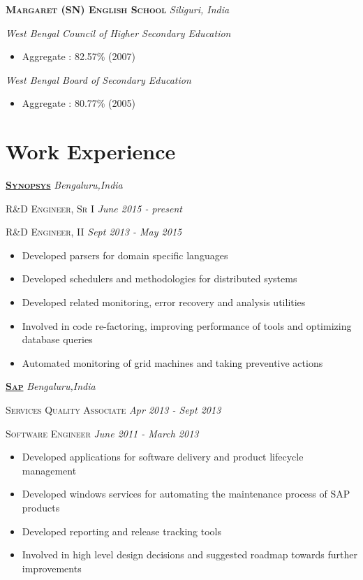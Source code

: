 \documentclass[]{article}
\begin{document}
{{{{{\raggedright\textsc{\textbf{Margaret (SN) English School}} \hfill {\raggedleft\textit{Siliguri, India}}
{\raggedright\textit{West Bengal Council of Higher Secondary Education}}
\begin{itemize}\item Aggregate : 82.57\% (2007)\end{itemize}
{\raggedright\textit{West Bengal Board of Secondary Education}}
\begin{itemize}\item Aggregate : 80.77\% (2005)\end{itemize}

\section{Work Experience}
{\raggedright\textsc{\textbf{\href{http://www.synopsys.com/}{Synopsys}}} \hfill {\raggedleft\textit{Bengaluru,India}}

{\raggedright\textsc{R\&D Engineer, Sr I} \hfill {\raggedleft\textit{June 2015 - present}}

{\raggedright\textsc{R\&D Engineer, II} \hfill {\raggedleft\textit{Sept 2013 - May 2015}}

\begin{itemize}
\item Developed parsers for domain specific languages
\item Developed schedulers and methodologies for distributed systems
\item Developed related monitoring, error recovery and analysis utilities
\item Involved in code re-factoring, improving performance of tools and optimizing database queries
\item Automated monitoring of grid machines and taking preventive actions 
\end{itemize}

{\raggedright\textsc{\textbf{\href{http://sap.com/}{Sap}}} \hfill {\raggedleft\textit{Bengaluru,India}}

{\raggedright\textsc{Services Quality Associate} {\textit{Apr 2013 - Sept 2013}}

{\raggedright\textsc{Software Engineer} \hfill {\raggedleft\textit{June 2011 - March 2013}}

\begin{itemize}
\item Developed applications for software delivery and product lifecycle management
\item Developed windows services for automating the maintenance process of SAP products
\item Developed reporting and release tracking tools
\item Involved in high level design decisions and suggested roadmap towards further improvements
\end{itemize}

}}}}}}}}}}}
\end{document}
